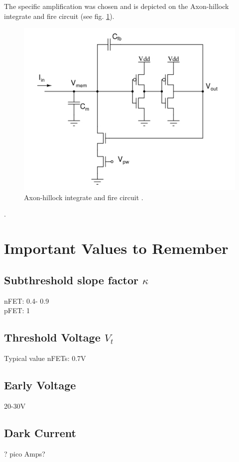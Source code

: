 The specific amplification was chosen and is depicted on the Axon-hillock integrate and fire circuit (see fig. \ref{fig:neuron_hillock}).

\begin{figure}[htbp]
  \centering
  \includegraphics[scale=0.8]{pics/neuron_hillock.jpg}
  \caption{Axon-hillock integrate and fire circuit \cite{lab11}.}
  \label{fig:neuron_hillock}
\end{figure} 


\cite{lab11}.

\section{Important Values to Remember}

\subsection{Subthreshold slope factor $\kappa$}
nFET: 0.4- 0.9\\
pFET: 1

\subsection{Threshold Voltage $V_t$}
Typical value nFETs: 0.7V

\subsection{Early Voltage}
20-30V

\subsection{Dark Current}
? pico Amps?

